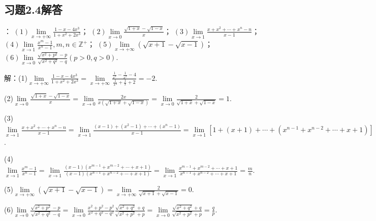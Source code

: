 \documentclass[12pt,UTF8]{ctexart}
\begin{document}
\subsection{习题2.4解答}
\begin{enumerate}
：
\newline
$(1)\lim\limits_{x\rightarrow+\infty}\frac{1-x-4x^3}{1+x^2+2x^3}$；
\newline
$(2)\lim\limits_{x\rightarrow0}\frac{\sqrt{1+x}-\sqrt{1-x}}x$；
\newline
$(3)\lim\limits_{x\rightarrow1}\frac{x+x^2+\cdots+x^n-n}{x-1}$；
\newline
$(4)\lim\limits_{x\rightarrow1}\frac{x^m-1}{x^n-1},m,n\in\mathbb Z^+$；
\newline
$(5)\lim\limits_{x\rightarrow+\infty}(\sqrt{x+1}-\sqrt{x-1})$；
\newline
$(6)\lim\limits_{x\rightarrow0}\frac{\sqrt{x^2+p^2}-p}{\sqrt{x^2+q^2}-q}(p>0,q>0)$.

解：(1)$\lim\limits_{x\rightarrow+\infty}\frac{1-x-4x^3}{1+x^2+2x^3}=\lim\limits_{x\rightarrow+\infty}\frac{\frac1{x^3}-\frac1{x^2}-4}{\frac1{x^3}+\frac1x+2}=-2$.

(2)$\lim\limits_{x\rightarrow0}\frac{\sqrt{1+x}-\sqrt{1-x}}x=\lim\limits_{x\rightarrow0}\frac{2x}{x(\sqrt{1+x}+\sqrt{1-x})}=\lim\limits_{x\rightarrow0}\frac2{\sqrt{1+x}+\sqrt{1-x}}=1$.

(3)$\lim\limits_{x\rightarrow1}\frac{x+x^2+\cdots+x^n-n}{x-1}=\lim\limits_{x\rightarrow1}\frac{(x-1)+(x^2-1)+\cdots+(x^n-1)}{x-1}=\lim\limits_{x\rightarrow1}[1+(x+1)+\cdots+(x^{n-1}+x^{n-2}+\cdots+x+1)]=1+2+\cdots+n=\frac{n(n+1)}2$.

(4)$\lim\limits_{x\rightarrow1}\frac{x^m-1}{x^n-1}=\lim\limits_{x\rightarrow1}\frac{(x-1)(x^{m-1}+x^{m-2}+\cdots+x+1)}{(x-1)(x^{n-1}+x^{n-2}+\cdots+x+1)}=\lim\limits_{x\rightarrow1}\frac{x^{m-1}+x^{m-2}+\cdots+x+1}{x^{n-1}+x^{n-2}+\cdots+x+1}=\frac mn$.

(5)$\lim\limits_{x\rightarrow+\infty}(\sqrt{x+1}-\sqrt{x-1})=\lim\limits_{x\rightarrow+\infty}\frac{2}{\sqrt{x+1}+\sqrt{x-1}}=0$.

(6)$\lim\limits_{x\rightarrow0}\frac{\sqrt{x^2+p^2}-p}{\sqrt{x^2+q^2}-q}=\lim\limits_{x\rightarrow0}\frac{x^2+p^2-p^2}{x^2+q^2-q^2}\frac{\sqrt{x^2+q^2}+q}{\sqrt{x^2+p^2}+p}=\lim\limits_{x\rightarrow0}\frac{\sqrt{x^2+q^2}+q}{\sqrt{x^2+p^2}+p}=\frac qp$.


\end{enumerate}
\end{document}
